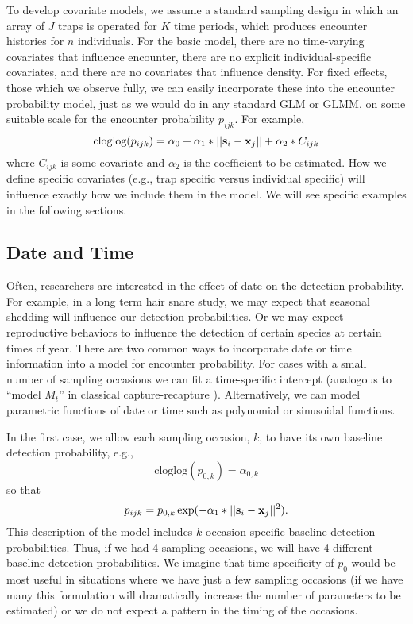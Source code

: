 To develop covariate models, we assume a standard sampling design in which an
array of $J$ traps is operated for $K$ time periods, which produces
encounter histories for $n$ individuals.  For the basic model, there
are no time-varying covariates that influence encounter, there are no
explicit individual-specific covariates, and there are no covariates
that influence density.  For fixed effects, those which we observe
fully, we can easily incorporate these into the encounter probability
model, just as we would do in any standard GLM or GLMM, on some
suitable scale for the encounter probability $p_{ijk}$. For example,
\[
\mbox{cloglog}(p_{ijk}) = \alpha_0 + \alpha_1*||{\bf s}_{i}-{\bf x}_{j}|| +
\alpha_2*C_{ijk}
\]
where $C_{ijk}$ is some covariate and
$\alpha_2$ is the coefficient to be estimated.
 How we define specific covariates (e.g., trap specific
versus individual specific) will influence exactly how we include them
in the model. We will see specific examples in the following sections.  





\subsection{Date and Time}

Often, researchers are interested in the effect of date on the detection
probability. For example, in a long term hair snare study, we may
expect that seasonal shedding will influence our detection
probabilities.  Or we may expect reproductive behaviors to influence
the detection of certain species at certain times of year.  There are
two common ways to incorporate date or time information into a model
for encounter probability. For cases with a small number of sampling
occasions we can fit a time-specific intercept (analogous to ``model
$M_{t}$'' in classical capture-recapture
\citep{otis_etal:1978}). Alternatively, we can model parametric
functions of date or time such as polynomial or sinusoidal functions.

In the first case, 
 we allow each sampling
occasion, $k$, to have its own baseline detection probability, e.g.,
\[
\mbox{cloglog}(p_{0,k}) = \alpha_{0,k}
\]
so that
\[
p_{ijk} = p_{0,k} \exp(- \alpha_1*||{\bf s}_{i}-{\bf x}_{j}||^2).
\]
This description of the model includes $k$ occasion-specific baseline
detection probabilities.  Thus, if we had 4 sampling occasions, we
will have 4 different baseline detection probabilities.  We imagine
that time-specificity of $p_{0}$ would be most useful in situations
where we have just a few sampling occasions (if we have many this
formulation will dramatically increase the number of parameters to be
estimated) or we do not expect a pattern in the timing of the
occasions.

